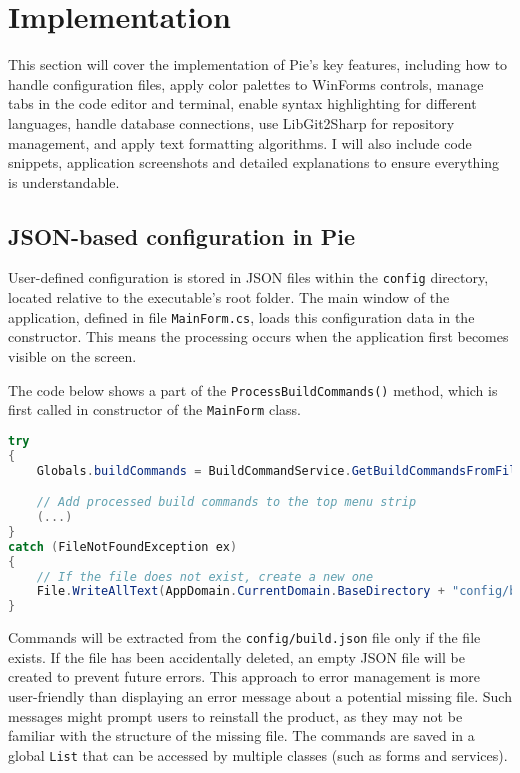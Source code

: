 \chapter{Implementation}
\thispagestyle{pagestyle}

This section will cover the implementation of Pie's key features, including how to handle configuration files, apply color palettes to WinForms controls, manage tabs in the code editor and terminal, enable syntax highlighting for different languages, handle database connections, use LibGit2Sharp for repository management, and apply text formatting algorithms. I will also include code snippets, application screenshots and detailed explanations to ensure everything is understandable.

\section{JSON-based configuration in Pie}

User-defined configuration is stored in JSON files within the \texttt{config} directory, located relative to the executable's root folder. The main window of the application, defined in file \texttt{MainForm.cs}, loads this configuration data in the constructor. This means the processing occurs when the application first becomes visible on the screen.

The code below shows a part of the \texttt{ProcessBuildCommands()} method, which is first called in constructor of the \texttt{MainForm} class.

\begin{lstlisting}[language=csharp, caption={Build command processing logic in MainForm's constructor}]
try
{
    Globals.buildCommands = BuildCommandService.GetBuildCommandsFromFile("config/build.json");

    // Add processed build commands to the top menu strip
    (...)
}
catch (FileNotFoundException ex)
{
    // If the file does not exist, create a new one
    File.WriteAllText(AppDomain.CurrentDomain.BaseDirectory + "config/build.json", "[]");
}

\end{lstlisting}

Commands will be extracted from the \texttt{config/build.json} file only if the file exists. If the file has been accidentally deleted, an empty JSON file will be created to prevent future errors. This approach to error management is more user-friendly than displaying an error message about a potential missing file. Such messages might prompt users to reinstall the product, as they may not be familiar with the structure of the missing file. The commands are saved in a global \texttt{List} that can be accessed by multiple classes (such as forms and services).

